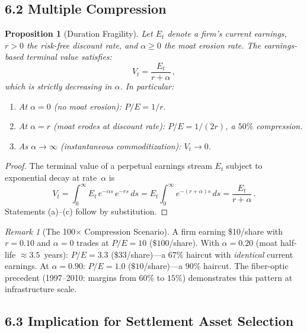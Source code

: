 \documentclass[12pt]{article}
\newtheorem{proposition}[theorem]{Proposition}
\theoremstyle{definition}
\theoremstyle{remark}
\newtheorem*{remark}{Remark}
\begin{document}
\subsection{6.2 Multiple Compression}

\begin{proposition}[Duration Fragility]\label{prop:duration}
Let $E_t$ denote a firm's current earnings, $r > 0$ the risk-free
discount rate, and $\alpha \geq 0$ the moat erosion rate. The
earnings-based terminal value satisfies:
\begin{equation}\label{eq:pe}
  V_t = \frac{E_t}{r + \alpha} \,,
\end{equation}
which is strictly decreasing in $\alpha$. In particular:
\begin{enumerate}[label=(\alph*)]
  \item At $\alpha = 0$ (no moat erosion): $P/E = 1/r$.
  \item At $\alpha = r$ (moat erodes at discount rate): $P/E = 1/(2r)$,
    a $50\%$ compression.
  \item As $\alpha \to \infty$ (instantaneous commoditization):
    $V_t \to 0$.
\end{enumerate}
\end{proposition}

\begin{proof}
The terminal value of a perpetual earnings stream $E_t$ subject to
exponential decay at rate~$\alpha$ is
\[
  V_t = \int_0^{\infty} E_t \, e^{-\alpha s} \, e^{-rs} \, ds
      = E_t \int_0^{\infty} e^{-(r+\alpha)s} \, ds
      = \frac{E_t}{r + \alpha} \,.
\]
Statements (a)--(c) follow by substitution.
\end{proof}

\begin{remark}[The 100$\times$ Compression Scenario]
A firm earning \$10/share with $r = 0.10$ and $\alpha = 0$ trades at
$P/E = 10$ ($\$100$/share). With $\alpha = 0.20$ (moat half-life
$\approx 3.5$~years): $P/E = 3.3$ ($\$33$/share)---a $67\%$ haircut
with \emph{identical} current earnings. At $\alpha = 0.90$: $P/E = 1.0$
($\$10$/share)---a $90\%$ haircut. The fiber-optic precedent
(1997--2010: margins from $60\%$ to $15\%$) demonstrates this pattern at
infrastructure scale.
\end{remark}

\subsection{6.3 Implication for Settlement Asset Selection}
\end{document}
